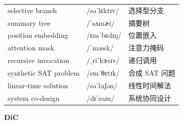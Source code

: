 \documentclass[UTF8,12pt,a4paper]{ctexart}
\providecommand{\zh}[1]{#1}
\begin{document}
\begin{tabular*}{\textwidth}{@{\extracolsep{\fill}}lll@{}}
selective branch & {\ipafont /səˈlɛktɪv/} & \zh{选择型分支} \\
summary tree & {\ipafont /ˈsʌmɚi/} & \zh{摘要树} \\
position embedding & {\ipafont /ɛmˈbɛdɪŋ/} & \zh{位置嵌入} \\
attention mask & {\ipafont /ˈmæsk/} & \zh{注意力掩码} \\
recursive invocation & {\ipafont /ˌriˈkɝsɪv/} & \zh{递归调用} \\
synthetic SAT problem & {\ipafont /sɪnˈθɛtɪk/} & \zh{合成 SAT 问题} \\
linear-time solution & {\ipafont /səˈluʃən/} & \zh{线性时间解法} \\
system co-design & {\ipafont /dɪˈzaɪn/} & \zh{系统协同设计} \\
\bottomrule
\end{tabular*}

\newpage

\begin{center}
    {\Large\bfseries DiC}
\end{center}
\end{document}
